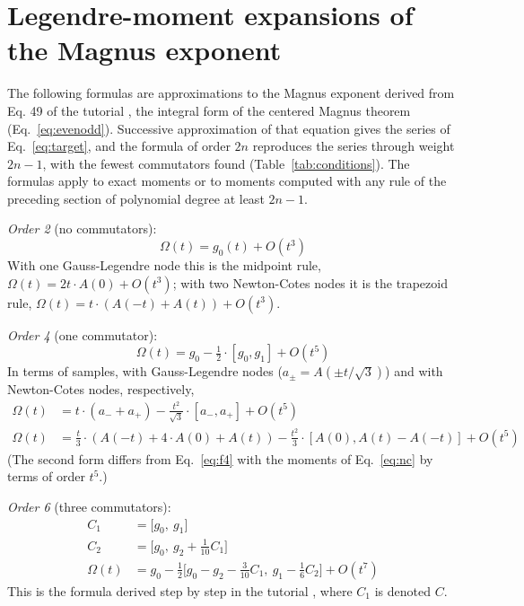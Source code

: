 \documentclass[12pt]{article}
\begin{document}
\section*{Legendre-moment expansions of the Magnus exponent}

The following formulas are approximations to the Magnus exponent derived from Eq. 49 of the tutorial \cite{jtut}, the integral form of the centered Magnus theorem (Eq.~\ref{eq:evenodd}). Successive approximation of that equation gives the series of Eq.~\ref{eq:target}, and the formula of order $2n$ reproduces the series through weight $2n-1$, with the fewest commutators found (Table~\ref{tab:conditions}). The formulas apply to exact moments or to moments computed with any rule of the preceding section of polynomial degree at least $2n-1$.

\emph{Order 2} (no commutators):
\begin{equation}
\Omega(t)=g_{0}(t)+O(t^{3})\label{eq:f2}
\end{equation}
With one Gauss-Legendre node this is the midpoint rule, $\Omega(t)=2t\cdot A(0)+O(t^3)$; with two Newton-Cotes nodes it is the trapezoid rule, $\Omega(t)=t\cdot(A(-t)+A(t))+O(t^3)$.

\emph{Order 4} (one commutator):
\begin{equation}
\Omega(t)=g_{0}-\tfrac{1}{2}\cdot[g_{0},g_{1}]+O(t^{5})\label{eq:f4}
\end{equation}
In terms of samples, with Gauss-Legendre nodes ($a_\pm=A(\pm t/\sqrt{3})$) and with Newton-Cotes nodes, respectively,
\begin{equation}
\begin{aligned}
\Omega(t)&=t\cdot(a_{-}+a_{+})-\tfrac{t^{2}}{\sqrt{3}}\cdot[a_{-},a_{+}]+O(t^{5})\\
\Omega(t)&=\tfrac{t}{3}\cdot(A(-t)+4\cdot A(0)+A(t))-\tfrac{t^{2}}{3}\cdot[A(0),A(t)-A(-t)]+O(t^{5})
\end{aligned}\label{eq:f4s}
\end{equation}
(The second form differs from Eq.~\ref{eq:f4} with the moments of Eq.~\ref{eq:nc} by terms of order $t^5$.)

\emph{Order 6} (three commutators):
\begin{equation}
\begin{aligned}
C_{1}&=\big[g_{0},\ g_{1}\big]\\
C_{2}&=\big[g_{0},\ g_{2}+\tfrac{1}{10}C_{1}\big]\\
\Omega(t)&=g_{0}-\tfrac{1}{2}\big[g_{0}-g_{2}-\tfrac{3}{10}C_{1},\ g_{1}-\tfrac{1}{6}C_{2}\big]+O(t^{7})
\end{aligned}\label{eq:f6}
\end{equation}
This is the formula derived step by step in the tutorial \cite{jtut}, where $C_1$ is denoted $C$.
\end{document}
